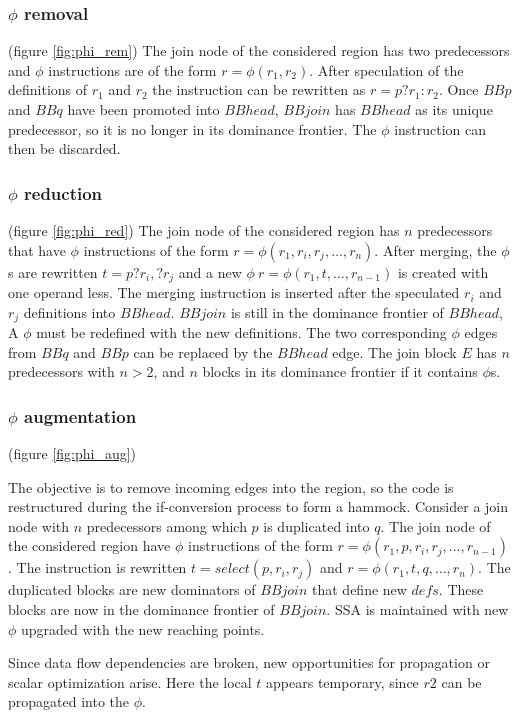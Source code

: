 \subsubsection{$\phi$ removal} (figure \ref{fig:phi_rem})
The join node of the considered region has two predecessors and $\phi$ instructions are of the form $r=\phi(r_1,r_2)$. After speculation of the definitions of $r_1$ and $r_2$ the instruction can be rewritten as $r=p?r_1:r_2$.
Once $BBp$ and $BBq$ have been promoted into $BBhead$, $BBjoin$ has $BBhead$ as its unique predecessor, so it is no longer in its dominance frontier. The $\phi$ instruction can then be discarded.

\subsubsection{$\phi$ reduction} (figure \ref{fig:phi_red})
 The join node of the considered region has $n$ predecessors that have $\phi$ instructions of the form $r=\phi(r_1,r_i,r_j,\dots,r_n)$. After merging, the $\phi$s are rewritten $t=p?r_i,?r_j$ and a new $\phi\:r=\phi(r_1,t,\dots,r_{n-1})$ is created with one operand less. The merging instruction is inserted after the speculated $r_i$ and $r_j$ definitions into $BBhead$.
$BBjoin$ is still in the dominance frontier of $BBhead$, A $\phi$ must be redefined with the new definitions. The two corresponding $\phi$ edges from $BBq$ and $BBp$ can be replaced by the $BBhead$ edge.
The join block $E$ has $n$ predecessors with $n > 2$, and $n$ blocks in its dominance frontier if it contains $\phi$s.

\subsubsection{$\phi$ augmentation} (figure \ref{fig:phi_aug})

The objective is to remove incoming edges into the region, so the code is restructured during the if-conversion process to form a hammock. Consider a join node with $n$ predecessors among which $p$ is duplicated into $q$.  The join node of the considered region have $\phi$ instructions of the form $r=\phi(r_1,p,r_i,r_j,\dots,r_{n-1})$. The instruction is rewritten $t=select(p,r_i,r_j)$ and \mbox{$r=\phi(r_1,t,q,\dots,r_n)$}. 
The duplicated blocks are new dominators of $BBjoin$ that define new $defs$. These blocks are now in the dominance frontier of $BBjoin$. SSA is maintained with new $\phi$ upgraded with the new reaching points.

Since data flow dependencies are broken, new opportunities for propagation or scalar optimization arise. Here the local $t$ appears temporary, since $r2$ can be propagated into the $\phi$.

